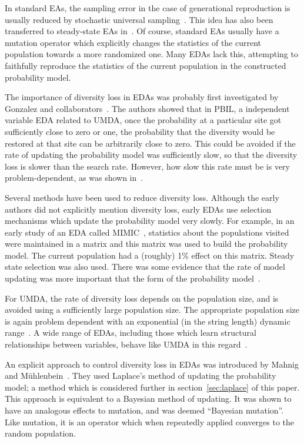 \documentclass{acm_proc_article-sp}
\begin{document}
In standard EAs, the sampling error in the case of
generational reproduction is usually reduced by stochastic universal
sampling~\cite{Bak87}. This idea has also been transferred to
steady-state EAs in~\cite{BCD99}. Of course, standard EAs usually have
a mutation operator which explicitly changes the statistics of the
current population towards a more randomized one. Many EDAs lack this,
attempting to faithfully reproduce the statistics of the current
population in the constructed probability model.

The importance of diversity loss in EDAs was probably first
investigated by Gonzalez and
collaborators~\cite{Gonzalez2001,Gonzalez2002}. The authors showed
that in PBIL, a independent variable EDA related to UMDA, once the
probability at a particular site got sufficiently close to zero or
one, the probability that the diversity would be restored at that site
can be arbitrarily close to zero. This could be avoided if the rate of
updating the probability model was sufficiently slow, so that the
diversity loss is slower than the search rate. However, how
slow this rate must be is very problem-dependent, as was shown
in~\cite{Shapiro2003a}. 

Several methods have been used to reduce diversity loss. Although the
early authors did not explicitly mention diversity loss, early EDAs
use selection mechanisms which update the probability model very
slowly. For example, in an early study of an EDA called
MIMIC~\cite{Baluja1997}, statistics about the populations visited were
maintained in a matrix and this matrix was used to build the
probability model. The current population had a (roughly) 1\% effect
on this matrix. Steady state selection was also used. There was some
evidence that the rate of model updating was more important that the
form of the probability model~\cite{Johnson2001}.

For UMDA, the rate of diversity loss depends
on the population size, and is avoided using a sufficiently large
population size. The appropriate population size is again problem
dependent with an exponential (in the string length) dynamic
range~\cite{Shapiro2005}. A wide range of EDAs,
including those which learn structural relationships between
variables, behave like UMDA in this regard~\cite{Shapiro2006}. 

An explicit approach to control diversity loss in EDAs was introduced by
Mahnig and M\"uhlenbein~\cite{Mahnig2001}. They used Laplace's method of
updating the probability model; a method which is considered further in
section~\ref{sec:laplace} of this paper. This approach is equivalent to a
Bayesian method of updating. It was shown to have an analogous effects to
mutation, and was deemed ``Bayesian mutation''. Like mutation, it is an
operator which when repeatedly applied converges to the random population.
\end{document}

